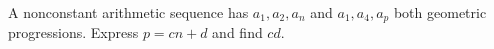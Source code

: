 A nonconstant arithmetic sequence has $a_1,a_2,a_n$ and $a_1,a_4,a_p$ both geometric progressions. Express $p=cn+d$ and find $cd$.
